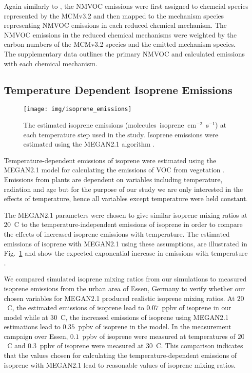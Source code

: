 Again similarly to \citet{vonSchneidemesser:2015}, the NMVOC emissions were first assigned to chemcial species represented by the MCMv3.2 and then mapped to the mechanism species representing NMVOC emissions in each reduced chemical mechanism.
The NMVOC emissions in the reduced chemical mechanisms were weighted by the carbon numbers of the MCMv3.2 species and the emitted mechanism species. 
The supplementary data outlines the primary NMVOC and calculated emissions with each chemical mechanism.

\subsection{Temperature Dependent Isoprene Emissions} \label{ss:megan}
\begin{figure}[t]%
    \centering%
    \caption{The estimated isoprene emissions (molecules~isoprene~cm$^{-2}$~s$^{-1}$) at each temperature step used in the study. Isoprene emissions were estimated using the MEGAN2.1 algorithm \citep{Guenther:2012}.}
    \label{f:isoprene_emissions}%
    \texttt{[image: img/isoprene\_emissions]}
\end{figure}
Temperature-dependent emissions of isoprene were estimated using the MEGAN2.1 model for calculating the emissions of VOC from vegetation \citep{Guenther:2012}.
Emissions from plants are dependent on variables including temperature, radiation and age but for the purpose of our study we are only interested in the effects of temperature, hence all variables except temperature were held constant.

The MEGAN2.1 parameters were chosen to give similar isoprene mixing ratios at $20$~\degree C to the temperature-independent emissions of isoprene in order to compare the effects of increased isoprene emissions with temperature.
The estimated emissions of isoprene with MEGAN2.1 using these assumptions, are illustrated in Fig.~\ref{f:isoprene_emissions} and show the expected exponential increase in emissions with temperature \citep{Guenther:2006}.

We compared simulated isoprene mixing ratios from our simulations to measured isoprene emissions from the urban area of Essen, Germany \citep{Wagner:2014} to verify whether our chosen variables for MEGAN2.1 produced realistic isoprene mixing ratios.
At $20$~\degree C, the estimated emissions of isoprene lead to $0.07$~ppbv of isoprene in our model while at $30$~\degree C, the increased emissions of isoprene using MEGAN2.1 estimations lead to $0.35$~ppbv of isoprene in the model.
In the measurement campaign over Essen, $0.1$~ppbv of isoprene were measured at temperatures of $20$~\degree C and $0.3$~ppbv of isoprene were measured at $30$~\degree C.
This comparison indicates that the values chosen for calculating the temperature-dependent emissions of isoprene with MEGAN2.1 lead to reasonable values of isoprene mixing ratios.

